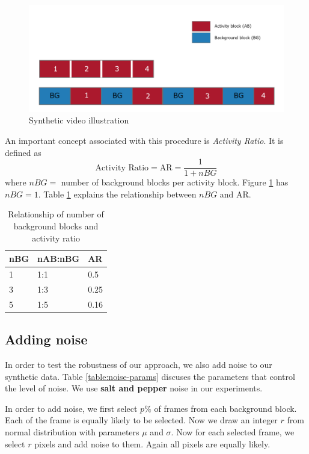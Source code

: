 \begin{figure}
    \centering
    \includegraphics[width=\linewidth]{images/synthetic-video.PNG}
    \caption{Synthetic video illustration}
    \label{fig:synthetic-video}
\end{figure}

An important concept associated with this procedure is \textit{Activity Ratio}. It is defined as 
$$ \text{Activity Ratio} = \text{AR} = \frac{1}{1+nBG} $$
where $nBG=$ number of background blocks per activity block. Figure \ref{fig:synthetic-video} has $nBG=1$. Table \ref{table:activity-ratio} explains the relationship between $nBG$ and AR. 


\begin{table}
\centering
\caption{Relationship of number of background blocks and activity ratio} \vspace{5pt}
\label{table:activity-ratio}
\begin{tabular}{@{}| l | l | l | @{}} \hline
nBG & nAB:nBG & AR   \\ \hline \hline
1   & 1:1     & 0.5  \\
3   & 1:3     & 0.25 \\
5   & 1:5     & 0.16 \\ \hline
\end{tabular}
\end{table}

\subsection{Adding noise}
In order to test the robustness of our approach, we also add noise to our synthetic data. Table \ref{table:noise-params} discuses the parameters that control the level of noise. We use \textbf{salt and pepper} noise in our experiments.

In order to add noise, we first select $p\%$ of frames from each background block. Each of the frame is equally likely to be selected. Now we draw an integer $r$ from normal distribution with parameters $\mu$ and $\sigma$. Now for each selected frame, we select $r$ pixels and add noise to them. Again all pixels are equally likely. 


